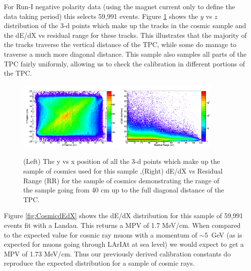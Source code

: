 For Run-I negative polarity data (using the magnet current only to define the data taking period) this selects 59,991 events. Figure \ref{fig:CosmicDist} shows the $y$ vs $z$ distribution of the 3-d points which make up the tracks in the cosmic sample and the dE/dX vs residual range for these tracks. This illustrates that the majority of the tracks traverse the vertical distance of the TPC, while some do manage to traverse a much more diagonal distance. This sample also samples all parts of the TPC fairly uniformly, allowing us to check the calibration in different portions of the TPC.

\begin{figure}[htb]
\centering
\includegraphics[width=0.45\textwidth]{images/CosmicDistYZ.png}
\includegraphics[width=0.45\textwidth]{images/CosmicDistdEdXRR.png}
\caption{(Left) The y vs x position of all the 3-d points which make up the sample of cosmics used for this sample ,(Right) dE/dX vs Residual Range (RR) for the sample of cosmics demonstrating the range of the sample going from 40 cm up to the full diagonal distance of the TPC.}
\label{fig:CosmicDist}
\end{figure}


Figure \ref{fig:CosmicdEdX} shows the dE/dX distribution for this sample of 59,991 events fit with a Landau. This returns a MPV of 1.7 MeV/cm. When compared to the expected value for cosmic ray muons with a momentum of $\sim$5~GeV (as is expected for muons going through LArIAt at sea level) we would expect to get a MPV of 1.73 MeV/cm. Thus our previously derived calibration constants do reproduce the expected distribution for a sample of cosmic rays.

